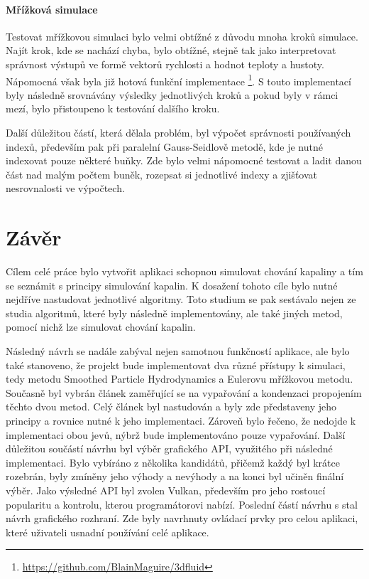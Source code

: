 \subsubsection{Mřížková simulace}
Testovat mřížkovou simulaci bylo velmi obtížné z důvodu mnoha kroků simulace. Najít krok, kde se nachází chyba, bylo obtížné, stejně tak jako interpretovat správnost výstupů ve formě vektorů rychlosti a hodnot teploty a hustoty. Nápomocná však byla již hotová funkční implementace \footnote{\url{https://github.com/BlainMaguire/3dfluid}}. S touto implementací byly následně srovnávány výsledky jednotlivých kroků a pokud byly v rámci mezí, bylo přistoupeno k testování dalšího kroku.

Další důležitou částí, která dělala problém, byl výpočet správnosti používaných indexů, především pak při paralelní Gauss-Seidlově metodě, kde je nutné indexovat pouze některé buňky. Zde bylo velmi nápomocné testovat a ladit danou část nad malým počtem buněk, rozepsat si jednotlivé indexy a zjišťovat nesrovnalosti ve výpočtech.


\chapter{Závěr}
\label{chapter:zaver}

Cílem celé práce bylo vytvořit aplikaci schopnou simulovat chování kapaliny a tím se seznámit s principy simulování kapalin. K dosažení tohoto cíle bylo nutné nejdříve nastudovat jednotlivé algoritmy. Toto studium se pak sestávalo nejen ze studia algoritmů, které byly následně implementovány, ale také jiných metod, pomocí nichž lze simulovat chování kapalin.

Následný návrh se nadále zabýval nejen samotnou funkčností aplikace, ale bylo také stanoveno, že projekt bude implementovat dva různé přístupy k simulaci, tedy metodu Smoothed Particle Hydrodynamics a Eulerovu mřížkovou metodu. Současně byl vybrán článek \cite{Evap&Cond} zaměřující se na vypařování a kondenzaci propojením těchto dvou metod. Celý článek byl nastudován a byly zde představeny jeho principy a rovnice nutné k jeho implementaci. Zároveň bylo řečeno, že nedojde k implementaci obou jevů, nýbrž bude implementováno pouze vypařování. Další důležitou součástí návrhu byl výběr grafického API, využitého při následné implementaci. Bylo vybíráno z několika kandidátů, přičemž každý byl krátce rozebrán, byly zmíněny jeho výhody a nevýhody a na konci byl učiněn finální výběr. Jako výsledné API byl zvolen Vulkan, především pro jeho rostoucí popularitu a kontrolu, kterou programátorovi nabízí. Poslední částí návrhu s stal návrh grafického rozhraní. Zde byly navrhnuty ovládací prvky pro celou aplikaci, které uživateli usnadní používání celé aplikace.

